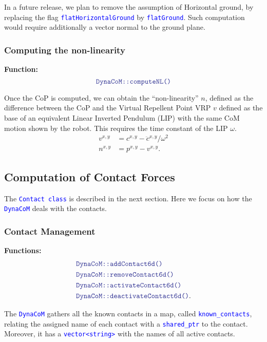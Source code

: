 \documentclass[12pt]{article}
\newcommand{\code}[2][Blue]{\textcolor{#1}{\texttt{#2}}}
\begin{document}
In a future release, we plan to remove the assumption of Horizontal ground, by replacing the flag \code{flatHorizontalGround} by \code{flatGround}. Such computation would require additionally a vector normal to the ground plane.

\subsubsection{Computing the non-linearity}

{\bf Function:}
\begin{equation*}
    \code{DynaCoM::computeNL()}
\end{equation*}

Once the CoP is computed, we can obtain the ``non-linearity'' $n$, defined as the difference between the CoP and the Virtual Repellent Point VRP $v$ defined as the base of an equivalent Linear Inverted Pendulum (LIP) with the same CoM motion shown by the robot. This requires the time constant of the LIP $ \omega $.
%
\begin{align}
    v^{x,y} &= c^{x,y} - \ddot{c}^{x,y}/\omega^2\\
    n^{x,y} &= p^{x,y} - v^{x,y}.
\end{align}

\clearpage
\newpage

\subsection{Computation of Contact Forces}
\hrulefill

The \code{Contact class} is described in the next section. Here we focus on how the \code{DynaCoM} deals with the contacts.

\subsubsection{Contact Management}

{\bf Functions:}
\begin{align*}
    &\code{DynaCoM::addContact6d()}\\
    &\code{DynaCoM::removeContact6d()}\\
    &\code{DynaCoM::activateContact6d()}\\
    &\code{DynaCoM::deactivateContact6d()}.
\end{align*}

The \code{DynaCoM} gathers all the known contacts in a map, called \code{known\_contacts}, relating the assigned name of each contact with a \code{shared\_ptr} to the contact. Moreover, it has a \code{vector<string>} with the names of all active contacts. 
\end{document}
